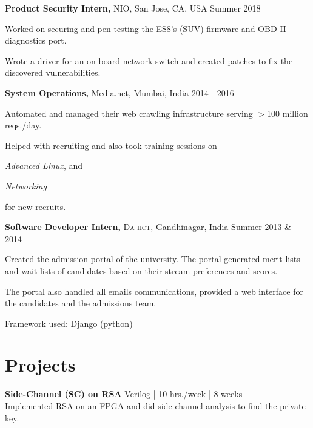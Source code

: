 \documentclass[margin]{res}
\newcommand{\daiict}{\textsc{Da-iict}}
\begin{document}
\begin{resume}
{\bf Product Security Intern,} NIO, San Jose, CA, USA
\hfill Summer 2018 %
\begin{itemizeexp}
    \item Worked on securing and pen-testing the ES8's (SUV) firmware and
    OBD-II diagnostics port.
    \item Wrote a driver for an on-board network switch and created patches
    to fix the discovered vulnerabilities.
\end{itemizeexp}

{\bf System Operations,} Media.net, Mumbai, India
\hfill 2014 - 2016 %
\begin{itemizeexp}
    \item Automated and managed their web crawling infrastructure serving
    $>$100 million reqs./day.
    \item Helped with recruiting and also took training sessions on 
    \begin{enumerate*}[label=(\roman*)]
      \item \textit{Advanced Linux}, and
      \item \textit{Networking}
    \end{enumerate*}
    for new recruits.
\end{itemizeexp}

{\bf Software Developer Intern,} \daiict, Gandhinagar, India
\hfill Summer 2013 \& 2014 %
\begin{itemizeexp}
    \item Created the admission portal of the university. The portal generated
    merit-lists and wait-lists of candidates based on their stream preferences
    and scores. 
    \item The portal also handled all emails communications, provided a
    web interface for the candidates and the admissions team.
    \item Framework used: Django (python)
\end{itemizeexp}

\section{Projects}
{\bfseries Side-Channel (SC) on RSA}\hfill
{\small Verilog | 10 hrs./week | 8 weeks}\\
Implemented RSA on an FPGA and did side-channel analysis to find the private key.\\[2ex]


\end{resume}
\end{document}
